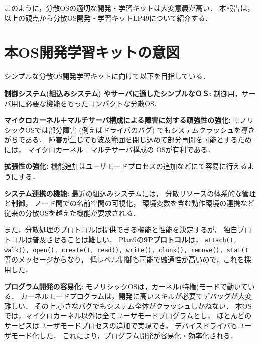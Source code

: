 \documentclass{ieicej}
\begin{document}
このように，分散OSの適切な開発・学習キットは大変意義が高い．
本報告は，以上の観点から分散OS開発・学習キットLP49について紹介する．


\section{本OS開発学習キットの意図}\label{sec:Enum}\label{sec:item}

シンプルな分散OS開発学習キットに向けて以下を目指している．


{\bf 制御システム(組込みシステム) やサーバに適したシンプルなＯＳ:} 
      制御用，サーバ用に必要な機能をもったコンパクトな分散OS．
    
{\bf マイクロカーネル＋マルチサーバ構成による障害に対する頑強性の強化:} 
    モノリシックOSでは部分障害 (例えばドライバのバグ) でもシステムクラッシュを導きがちである．
    障害が生じても波及範囲を閉じ込めて部分再開を可能とするためには，
    マイクロカーネル＋マルチサーバ構成の OSが有利である．
    
{\bf 拡張性の強化:} 
    機能追加はユーザモードプロセスの追加などにて容易に行えるようにする．

{\bf システム連携の機能:} 
   最近の組込みシステムには，
   分散リソースの体系的な管理と制御，
   ノード間での名前空間の可視化，
   環境変数を含む動作環境の連携など
   従来の分散OSを越えた機能が要求される．

    また，分散処理のプロトコルは提供できる機能と性能を決定するが，
  独自プロトコルは普及させることは難しい．
  Plan9\cite{plan9}の{\bf 9Pプロトコル}は，
  {\tt attach(), walk(), open(), create(), 
  read(), write(), clunk(), remove(), stat()}
  等のメッセージからなり，
  低レベル制御も可能で融通性が高いので，これを採用した．


{\bf プログラム開発の容易化:} 
   モノリシックOSは，カーネル(特権)モードで動いている．
   カーネルモードプログラムは，開発に高いスキルが必要でデバッグが大変難しい．
   その上,小さなバグでもシステム全体がクラッシュしかねない．
   本OSでは，マイクロカーネル以外は全てユーザモードプログラムとし，
   ほとんどのサービスはユーザモードプロセスの追加で実現でき，
   デバイスドライバもユーザモード化した．
   これにより，プログラム開発が容易化・効率化される．
\end{document}
